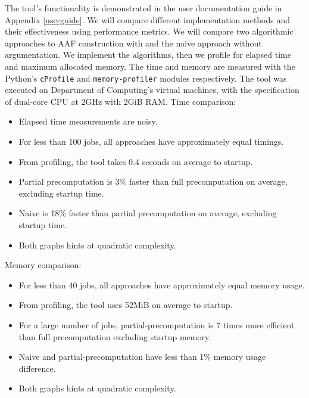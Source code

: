 The tool's functionality is demonstrated in the user documentation guide in Appendix \ref{userguide}. We will compare different implementation methods and their effectiveness using performance metrics. We will compare two algorithmic approaches to AAF construction with and the naive approach without argumentation. We implement the algorithms, then we profile for elapsed time and maximum allocated memory. The time and memory are measured with the Python's \texttt{cProfile} and \texttt{memory-profiler} modules respectively. The tool was executed on Department of Computing's virtual machines, with the specification of dual-core CPU at 2GHz with 2GiB RAM.
\linespace
Time comparison:
\begin{itemize}
	\item Elapsed time measurements are noisy.
	\item For less than 100 jobs, all approaches have approximately equal timings.
	\item From profiling, the tool takes 0.4 seconds on average to startup.
	\item Partial precomputation is 3\% faster than full precomputation on average, excluding startup time.
	\item Naive is 18\% faster than partial precomputation on average, excluding startup time.
	\item Both graphs hints at quadratic complexity.
\end{itemize}

Memory comparison:
\begin{itemize}
	\item For less than 40 jobs, all approaches have approximately equal memory usage.
	\item From profiling, the tool uses 52MiB on average to startup.
	\item For a large number of jobs, partial-precomputation is 7 times more efficient than full precomputation excluding startup memory.
	\item Naive and partial-precomputation have less than 1\% memory usage difference.
	\item Both graphs hints at quadratic complexity.
\end{itemize}

\newpage

